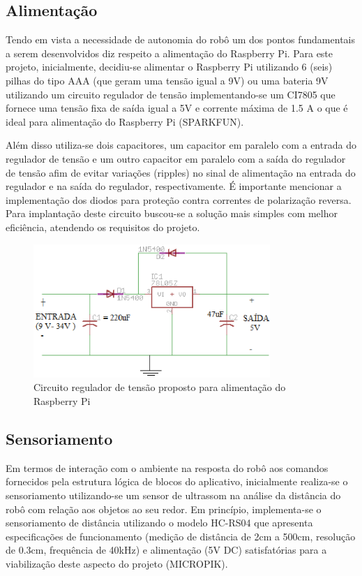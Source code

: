\subsection{Alimentação}

Tendo em vista a necessidade de autonomia do robô um dos pontos fundamentais a serem desenvolvidos diz respeito a alimentação do Raspberry Pi. Para este projeto, inicialmente, decidiu-se alimentar o Raspberry Pi utilizando 6 (seis) pilhas do tipo AAA (que geram uma tensão igual a 9V) ou uma bateria 9V utilizando um circuito regulador de tensão implementando-se um CI7805 que fornece uma tensão fixa de saída igual a 5V e corrente máxima de 1.5 A o que é ideal para alimentação do Raspberry Pi (SPARKFUN).

Além disso utiliza-se dois capacitores, um capacitor em paralelo com a entrada do regulador de tensão e um outro capacitor em paralelo com a saída do regulador de tensão afim de evitar variações (ripples) no sinal de alimentação na entrada do regulador e na saída do regulador, respectivamente. É importante mencionar a implementação dos diodos para proteção contra correntes de polarização reversa. Para implantação deste circuito buscou-se a solução mais simples com melhor eficiência, atendendo os requisitos do projeto.

\begin{figure}[H]
    \centering
    \includegraphics[width=0.8\textwidth]{figuras/esquematico_regulador.eps}
    \caption{Circuito regulador de tensão proposto para alimentação do Raspberry Pi}
    \label{fig:catia01}
\end{figure}

\subsection{Sensoriamento}

Em termos de interação com o ambiente na resposta do robô aos comandos fornecidos pela estrutura lógica de blocos do aplicativo, inicialmente realiza-se o sensoriamento utilizando-se um sensor de ultrassom na análise da distância do robô com relação aos objetos ao seu redor. Em princípio, implementa-se o sensoriamento de distância utilizando o modelo HC-RS04 que apresenta especificações de funcionamento (medição de distância de 2cm a 500cm, resolução de 0.3cm, frequência de 40kHz) e alimentação (5V DC) satisfatórias para a viabilização deste aspecto do projeto (MICROPIK).

